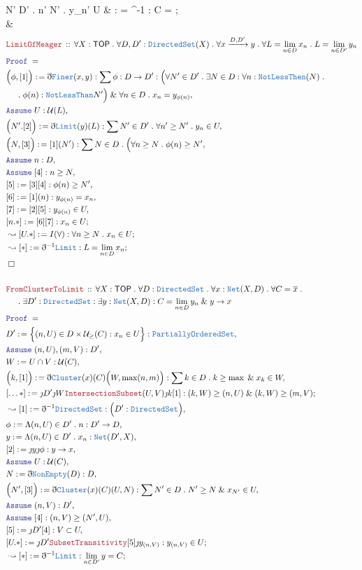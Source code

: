 \documentclass[12pt]{scrartcl}
\newcommand{\TYPE}[1]{\textcolor{NavyBlue}{\mathtt{#1}}}
\newcommand{\LOGIC}[1]{\textcolor{Blue}{\mathtt{#1}}}
\newcommand{\THM}[1]{\textcolor{Maroon}{\mathtt{#1}}}
\renewcommand{\.}{\; . \;}
\newcommand{\de}{: \kern 0.1pc =}
\newcommand{\Theorem}[2]{& \THM{#1} \, :: \, #2 \\ & \Proof = \\ }
\newcommand{\NewLine}{\\ & \kern 1pc}
\newcommand{\Page}[1]{ \begin{align*} #1 \end{align*}   }
\newcommand{ \bd }{ \ByDef }
\renewcommand{\And}{\; \& \;}
\newcommand{\Arrow}{\xrightarrow}
\newcommand{\Say}[3]{& #1 \de #2 : #3, \\}
\newcommand{\Conclude}[3]{& #1 \de #2 : #3; \\}
\newcommand{\Derive}[3]{& \leadsto #1 \de #2 : #3, \\}
\newcommand{\DeriveConclude}[3]{& \leadsto #1 \de #2 : #3 ; \\}
\newcommand{\Assume}[2]{& \LOGIC{Assume} \; #1 : #2, \\}
\newcommand{\QED}{\; \square}
\newcommand{\EndProof}{& \QED \\}
\newcommand{\ByDef}{\eth}
\newcommand{\ByConstr}{\jmath}
\newcommand{\Proof}{\LOGIC{Proof} \; }
\newcommand{\TOP}{\mathsf{TOP}}
\newcommand{\U}{\mathcal{U}}
\begin{document}
{{		\forall N' \in D' \.
		\exists n' \ge N' \. y_{n'} \in U
	}
	\DeriveConclude{[*]}{\bd^{-1}\TYPE{Cluster}}{C = }
	\EndProof
}\Page{
	\Theorem{LimitOfMeager}
	{
		\forall X : \TOP \.
		\forall D,D' : \TYPE{DirectedSet}(X) \.
		\forall  x \Arrow{D,D'} y \.
		\forall L = \lim_{n \in D} x_n \.
		L = \lim_{n \in D'} y_n
	}
	\Say{\Big(\phi, [1] \Big)}{ \bd \TYPE{Finer}(x,y) }
	{
		\sum \phi : D \to D' : 
		\Big(\forall N' \in D' \. \exists N \in D : \forall n : \TYPE{NotLessThen}(N) \. \NewLine \.
			\phi(n) : \TYPE{NotLessThan} N'\Big) \And 
		\forall n \in D \.  x_n = y_{\phi(n)} 
	}
	\Assume{U}{\U(L)}
	\Say{\Big( N'. [2]\Big)}{\bd \TYPE{Limit}(y)(L) }
	{
		\sum N' \in D' \. \forall n' \ge N' \. y_n \in U   
	}
	\Say{\Big(N,[3]\Big)}{[1](N')}{
		\sum N \in D \.  \Big( 
		\forall n \ge N  \. 
		\phi(n) \ge N'
	}
	\Assume{n}{D}
	\Assume{[4]}{n \ge N}
	\Say{[5]}{[3][4]}{\phi(n) \ge N'}
	\Say{[6]}{[1](n)}{  y_{\phi(n)} = x_n   }
	\Say{[7]}{ [2][5]}{  y_{\phi(n)} \in U  }
	\Conclude{[n.*]}{[6][7]}{ x_n \in U  }
	\DeriveConclude{[U.*]}{ I(\forall) }{ 
		\forall n \ge N \. x_n \in U
	}
	\DeriveConclude{[*]}{\bd^{-1}\TYPE{Limit}}{L = \lim_{n \in D} x_n}
	\EndProof
	\\
	\Theorem{FromClusterToLimit}
	{
		\forall X : \TOP \.
		\forall D : \TYPE{DirectedSet} \.
		\forall x : \TYPE{Net}(X, D) \.
		\forall C = \overline{x} \. \NewLine \.
		\exists D' : \TYPE{DirectedSet} :
		\exists y  : \TYPE{Net}(X,D) : 
		C = \lim_{n \in D} y_n \And y \to x 
	}
	\Say{D'}{ \Big\{ (n,U) \in D \times \U_{\ge}(C) : x_n \in U \Big\}}
	{
		\TYPE{PartiallyOrderedSet}
	}
	\Assume{ (n,U),(m,V)  }{D'}
	\Say{W}{U \cap V}{ \U(C) }
	\Say{\Big(k,[1]\Big)}{\bd \TYPE{Cluster}(x)(C)\Big(W,\max(n,m)\Big)}
	{
		\sum k \in D \. k \ge \max \And x_k \in W
	}
	\Conclude{[\ldots*]}{\ByConstr D' \ByConstr W \THM{IntersectionSubset}(U,V) \ByConstr k[1]}
	{ (k,W) \ge (n,U) \And  (k,W) \ge (m,V)  }
	\Derive{[1]}{\bd^{-1} \TYPE{DirectedSet}}
	{
		\Big( D' : \TYPE{DirectedSet} \Big)   
	}
	\Say{\phi}{ \Lambda (n,U) \in D' \. n  }{D' \to D}
	\Say{y}{\Lambda (n,U) \in D' \. x_n }{\TYPE{Net}(D',X)}
	\Say{[2]}{\ByConstr y \ByConstr \phi}{ y \to x}
	\Assume{U}{\U(C)}
	\Say{N}{\bd \TYPE{NonEmpty}(D)}{D}
	\Say{\Big(N',[3]\Big)}{\bd \TYPE{Cluster}(x)(C)(U,N)}
	{
		\sum N' \in D \. N' \ge N \And x_{N'} \in U  
	}
	\Assume{(n,V)}{D'}
	\Assume{[4]}{(n,V) \ge (N',U)}
	\Say{[5]}{\ByConstr D' [4]}{  V \subset U  }
	\Conclude{[U.*]}{\ByConstr D' \THM{SubsetTransitivity}[5]\ByConstr y_{(n,V)}}
	{  y_{(n,V)} \in U  }
	\DeriveConclude{[*]}{\bd^{-1}\TYPE{Limit}}
	{
		\lim_{n \in D'} y = C
}}
\end{document}
